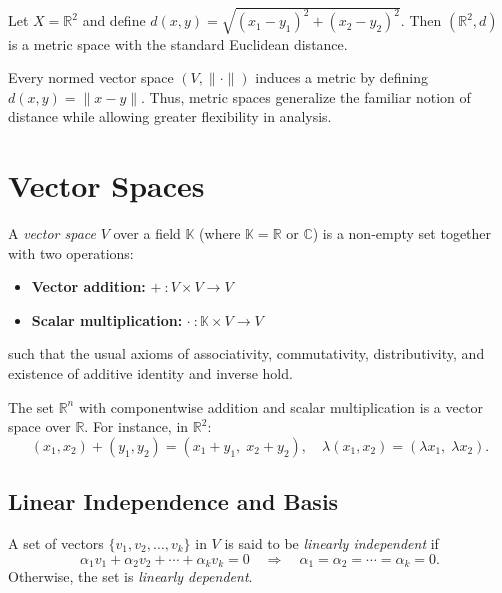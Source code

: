 \begin{example}
Let $X = \mathbb{R}^2$ and define $d(x,y) = \sqrt{(x_1-y_1)^2+(x_2-y_2)^2}$.  
Then $(\mathbb{R}^2,d)$ is a metric space with the standard Euclidean distance.
\end{example}

\begin{remark}
Every normed vector space $(V,\|\cdot\|)$ induces a metric by defining $d(x,y) = \|x-y\|$.  
Thus, metric spaces generalize the familiar notion of distance while allowing greater flexibility in analysis.
\end{remark}

\section{Vector Spaces}

\begin{definition}
A \emph{vector space} $V$ over a field $\mathbb{K}$ (where $\mathbb{K} = \mathbb{R}$ or $\mathbb{C}$) is a non-empty set together with two operations:
\begin{itemize}
    \item \textbf{Vector addition:} $+\ : V \times V \to V$
    \item \textbf{Scalar multiplication:} $\cdot\ : \mathbb{K} \times V \to V$
\end{itemize}
such that the usual axioms of associativity, commutativity, distributivity, and existence of additive identity and inverse hold.
\end{definition}

\begin{example}
The set $\mathbb{R}^n$ with componentwise addition and scalar multiplication is a vector space over $\mathbb{R}$.  
For instance, in $\mathbb{R}^2$:  
\[
(x_1,x_2) + (y_1,y_2) = (x_1+y_1,\; x_2+y_2), \quad 
\lambda(x_1,x_2) = (\lambda x_1,\; \lambda x_2).
\]
\end{example}

\subsection{Linear Independence and Basis}

\begin{definition}
A set of vectors $\{v_1,v_2,\dots,v_k\}$ in $V$ is said to be \emph{linearly independent} if 
\[
\alpha_1 v_1 + \alpha_2 v_2 + \cdots + \alpha_k v_k = 0 \quad \Rightarrow \quad \alpha_1=\alpha_2=\cdots=\alpha_k=0.
\]
Otherwise, the set is \emph{linearly dependent}.
\end{definition}

